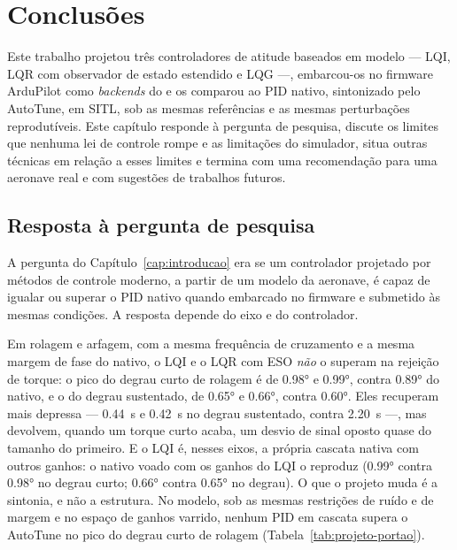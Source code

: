%
\chapter{Conclusões}
\label{cap:conclusoes}

Este trabalho projetou três controladores de atitude baseados em modelo ---
LQI, LQR com observador de estado estendido e LQG ---, embarcou-os no
firmware ArduPilot como \textit{backends} do  e os
comparou ao PID nativo, sintonizado pelo AutoTune, em SITL, sob as mesmas
referências e as mesmas perturbações reprodutíveis. Este capítulo responde à
pergunta de pesquisa, discute os limites que nenhuma lei de controle rompe e
as limitações do simulador, situa outras técnicas em relação a esses limites
e termina com uma recomendação para uma aeronave real e com sugestões de
trabalhos futuros.

\section{Resposta à pergunta de pesquisa}
\label{sec:resposta}

A pergunta do Capítulo~\ref{cap:introducao} era se um controlador projetado
por métodos de controle moderno, a partir de um modelo da aeronave, é capaz
de igualar ou superar o PID nativo quando embarcado no firmware e submetido
às mesmas condições. A resposta depende do eixo e do controlador.

Em rolagem e arfagem, com a mesma frequência de cruzamento e a mesma margem
de fase do nativo, o LQI e o LQR com ESO \emph{não} o superam na rejeição de
torque: o pico do degrau curto de rolagem é de \ang{0.98} e \ang{0.99},
contra \ang{0.89} do nativo, e o do degrau sustentado, de \ang{0.65} e
\ang{0.66}, contra \ang{0.60}. Eles recuperam mais depressa ---
\SI{0.44}{\second} e \SI{0.42}{\second} no degrau sustentado, contra
\SI{2.20}{\second} ---, mas devolvem, quando um torque curto acaba, um
desvio de sinal oposto quase do tamanho do primeiro. E o LQI é, nesses
eixos, a própria cascata nativa com outros ganhos: o nativo voado com os
ganhos do LQI o reproduz (\ang{0.99} contra \ang{0.98} no degrau curto;
\ang{0.66} contra \ang{0.65} no degrau). O que o projeto muda é a sintonia, e
não a estrutura. No modelo, sob as mesmas restrições de ruído e de margem e
no espaço de ganhos varrido, nenhum PID em cascata supera o AutoTune no pico
do degrau curto de rolagem (Tabela~\ref{tab:projeto-portao}).

